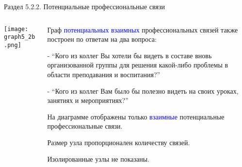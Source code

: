 \begin{frame}{Раздел 5.2.2. Потенциальные профессиональные связи}

\begin{columns} 
\begin{column}{0.75\textwidth}
\centering
          \texttt{[image: graph5\_2b.png]}
\end{column}
\begin{column}{0.25\textwidth} 

\tiny
Граф \textcolor{blue}{потенциальных взаимных} профессиональных связей также построен по ответам на два вопроса:
\smallskip

- ``Кого из коллег Вы хотели бы видеть в составе вновь организованной группы для решения какой-либо проблемы в области преподавания и воспитания?''
\smallskip

- ``Кого из коллег Вам было бы полезно видеть на своих уроках, занятиях и мероприятиях?''
\smallskip

На диаграмме отображены только \textcolor{blue}{взаимные} потенциальные профессиональные связи.
\smallskip

Размер узла пропорционален количеству связей.
\smallskip

Изолированные узлы не показаны.

\end{column}
\end{columns}
\end{frame}


